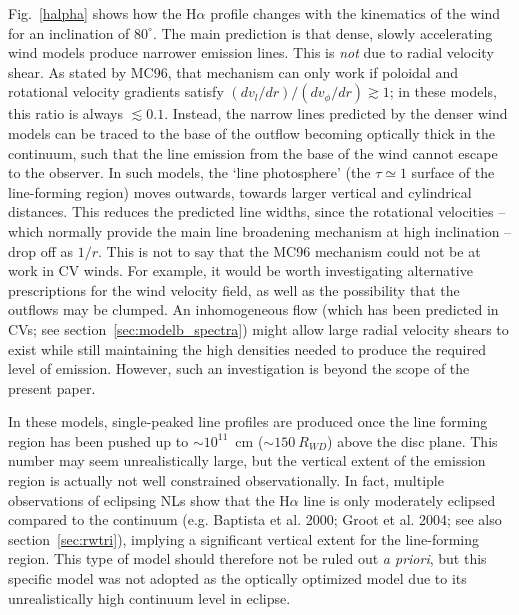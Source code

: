 Fig.~\ref{halpha} shows how the H$\alpha$ profile changes with the kinematics of the wind for 
an inclination of $80^\circ$. The main prediction is that dense, slowly accelerating 
wind models produce narrower emission lines. This is {\em not} due to radial 
velocity shear. As stated by MC96, that mechanism can only work if poloidal 
and rotational velocity gradients satisfy $(dv_l/dr)/(dv_\phi/dr) \gtrsim 1$; in 
these models, this ratio is always $\lesssim 0.1$. Instead, the narrow lines predicted 
by the denser wind models can be traced to the base of the outflow becoming optically 
thick in the continuum, such that the line emission from the base of the wind
cannot escape to the observer. In such models, the `line photosphere'
(the $\tau \simeq 1$ surface of the line-forming region) moves outwards, towards larger 
vertical and cylindrical distances. This reduces the predicted line widths, since the 
rotational velocities -- which normally provide the main line broadening mechanism at 
high inclination -- drop off as $1/r$. This is not to say that the MC96 
mechanism could not be at work in CV winds. For example, it would be worth investigating
alternative prescriptions for the wind velocity field, as well as the possibility that the 
outflows may be clumped. An inhomogeneous flow 
(which has been predicted in CVs; see section~\ref{sec:modelb_spectra})
might allow large radial velocity shears to exist while still 
maintaining the high densities needed to produce the required level of emission.
However, such an investigation is beyond the scope of the present paper.

In these models, single-peaked line profiles are produced once the line forming region 
has been
pushed up to $\sim 10^{11}$~cm ($\sim150~R_{WD}$) above the disc plane. 
This number may seem unrealistically large, but the vertical extent of 
the emission region is actually not well constrained observationally. 
In fact, multiple observations of eclipsing NLs show that the H$\alpha$ 
line is only moderately eclipsed compared to the continuum (e.g. Baptista et al. 2000;
Groot et al. 2004; see also section~\ref{sec:rwtri}), 
implying a significant vertical extent for the line-forming 
region. This type of model should therefore not be ruled out {\em a priori}, 
but this specific model was not adopted as the optically optimized model
due to its unrealistically high continuum level in eclipse. 

